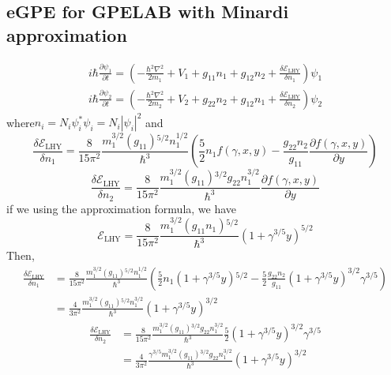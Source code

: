\subsection{eGPE for GPELAB with Minardi approximation}

\begin{equation}
\begin{split}
i \hbar \frac{\partial\psi_1}{\partial t}=\left(-\frac{\hbar^2\nabla^2}{2m_1}+V_1+g_{11}n_1+g_{12}n_2+\frac{\delta  \mathcal{E}_{\text{LHY}}}{\delta n_1}\right)\psi _1\\
i \hbar \frac{\partial \psi _2}{\partial t}=\left(-\frac{\hbar ^2\nabla ^2}{2m_2}+V_2+g_{22}n_2+g_{12}n_1+\frac{\delta  \mathcal{E}_{\text{LHY}}}{\delta n_2}\right)\psi _2
\end{split}
\end{equation}
where$n_i=N_i\psi _i^*\psi _i=N_i|\psi _i|^2$ and 
\begin{equation}
\frac{\delta  \mathcal{E}_{\text{LHY}}}{\delta  n_1}=\frac{8}{15\pi^2}\frac{m_1^{3/2}\left(g_{11}\right){}^{5/2}n_1^{1/2}}{\hbar^3}\left(\frac{5}{2}n_1f(\gamma,x,y)-\frac{g_{22}n_2}{g_{11}}\frac{\partial f(\gamma ,x,y)}{\partial y}\right)
\end{equation}
\begin{equation}
\frac{\delta  \mathcal{E}_{\text{LHY}}}{\delta  n_2}=\frac{8}{15\pi^2}\frac{m_1^{3/2}\left(g_{11}\right){}^{3/2}g_{22}n_1^{3/2}}{\hbar ^3}\frac{\partial
f(\gamma ,x,y)}{\partial y}
\end{equation}
if we using the approximation formula, we have
\begin{equation}
\mathcal{E}_{\text{LHY}}=\frac{8}{15\pi ^2}\frac{m_1^{3/2}\left(g_{11}n_1\right){}^{5/2}}{\hbar ^3}\left(1+\gamma ^{3/5}y\right)^{5/2}
\end{equation}
Then, 
\begin{equation}
\begin{split}
\frac{\delta  \mathcal{E}_{\text{LHY}}}{\delta  n_1}&=\frac{8}{15\pi^2}\frac{m_1^{3/2}\left(g_{11}\right){}^{5/2}n_1^{1/2}}{\hbar^3}\left(\frac{5}{2}n_1\left(1+\gamma^{3/5}y\right){}^{5/2}-\frac{5}{2}\frac{g_{22}n_2}{g_{11}}\left(1+\gamma ^{3/5}y\right)^{3/2}\gamma ^{3/5}\right)\\
&=\frac{4}{3\pi^2}\frac{m_1^{3/2}\left(g_{11}\right){}^{5/2}n_1^{3/2}}{\hbar^3}\left(1+\gamma^{3/5}y\right)^{3/2}
\end{split}
\end{equation}
\begin{equation}
\begin{split}
\frac{\delta  \mathcal{E}_{\text{LHY}}}{\delta n_2}&=\frac{8}{15\pi^2}\frac{m_1^{3/2}\left(g_{11}\right){}^{3/2}g_{22}n_1^{3/2}}{\hbar^3}\frac{5}{2}\left(1+\gamma^{3/5}y\right)^{3/2}\gamma ^{3/5}\\
&=\frac{4}{3\pi^2}\frac{\gamma^{3/5}m_1^{3/2}\left(g_{11}\right){}^{3/2}g_{22}n_1^{3/2}}{\hbar^3}\left(1+\gamma ^{3/5}y\right)^{3/2}
\end{split}
\end{equation}
